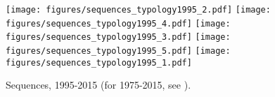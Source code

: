 \documentclass[12pt]{article}
\begin{document}
\begin{figure}[htbp]
  \centering
  \caption{Sequences, 1995-2015 (for 1975-2015, see ).}
  \label{sequences_typology1995}
  \texttt{[image: figures/sequences\_typology1995\_2.pdf]}
  \texttt{[image: figures/sequences\_typology1995\_4.pdf]}
  \texttt{[image: figures/sequences\_typology1995\_3.pdf]}
  \texttt{[image: figures/sequences\_typology1995\_5.pdf]}
  \texttt{[image: figures/sequences\_typology1995\_1.pdf]}
\end{figure}
\end{document}
